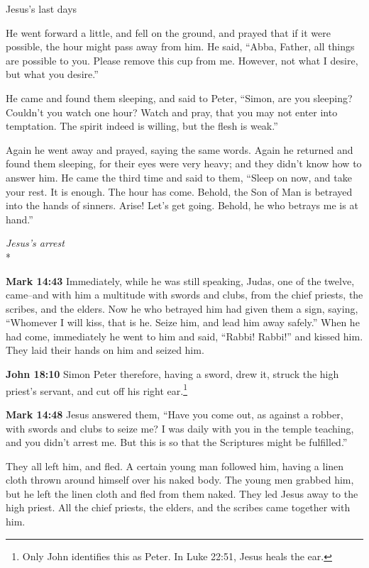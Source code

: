 \documentclass[10pt,twoside]{article} %
\newcommand{\doimage}[2]{\texttt{[image: \#2]}\label{fig:#2}}
\newcommand{\figbasic}[4]{ %
    \ifthenelse{\isodd{\pageref{fig:#2}}}{}{\hfill}
    \ifstrempty{#3}{
      \doimage{#1}{#2}
    }{
      \makebox{\doimage{#1}{#2} \\ #3}
    }
    \ifthenelse{\isodd{\pageref{fig:#2}}}{\hfill}{}
    \par
}
\newcommand{\fig}[2][0.4]{
  \figbasic{#1}{#2}{}{}
}
\newcommand{\quotesize}{\normalsize{}}
\newenvironment{quotetext}{\begingroup\quotesize}{\endgroup}
\newcommand{\intex}[1]{\index[texts]{#1}}
\newcommand{\bible}[2]{\begin{quotetext}\textbf{#1}\intex{#1} #2\end{quotetext}}
\newcommand{\gospelmark}[2]{\bible{Mark #1}{#2}}
\newcommand{\john}[2]{\bible{John #1}{#2}}
\newcommand{\subhead}[1]{\emph{#1}\\*}
\begin{document}
\begin{section}{Jesus's last days}
{  He went forward a little, and fell on the ground, and prayed that if it were possible, the hour might pass away from him.   He said, ``Abba, Father, all things are possible to you. Please remove this cup from me. However, not what I desire, but what you desire.''

  He came and found them sleeping, and said to Peter, ``Simon, are you sleeping? Couldn't you watch one hour?    Watch and pray, that you may not enter into temptation. The spirit indeed is willing, but the flesh is weak.''

  Again he went away and prayed, saying the same words.   Again he returned and found them sleeping, for their eyes were very heavy; and they didn't know how to answer him.   He came the third time and said to them, ``Sleep on now, and take your rest. It is enough. The hour has come. Behold, the Son of Man is betrayed into the hands of sinners.    Arise! Let's get going. Behold, he who betrays me is at hand.''
}

\fig{judas-kiss}

\subhead{Jesus's arrest}

\gospelmark{14:43}{
  Immediately, while he was still speaking, Judas, one of the twelve, came--and with him a multitude with swords and clubs, from the chief priests, the scribes, and the elders.   Now he who betrayed him had given them a sign, saying, ``Whomever I will kiss, that is he. Seize him, and lead him away safely.''   When he had come, immediately he went to him and said, ``Rabbi! Rabbi!'' and kissed him.   They laid their hands on him and seized him.}

\john{18:10}{
  Simon Peter therefore, having a sword, drew it, struck the high priest’s servant, and cut off his right ear.\footnote{Only John identifies this as Peter. In Luke 22:51, Jesus heals the ear.}
}

\gospelmark{14:48}{
  Jesus answered them, ``Have you come out, as against a robber, with swords and clubs to seize me?    I was daily with you in the temple teaching, and you didn't arrest me. But this is so that the Scriptures might be fulfilled.''

  They all left him, and fled.   A certain young man followed him, having a linen cloth thrown around himself over his naked body. The young men grabbed him,   but he left the linen cloth and fled from them naked.   They led Jesus away to the high priest. All the chief priests, the elders, and the scribes came together with him.
}


\end{section}
\end{document}
